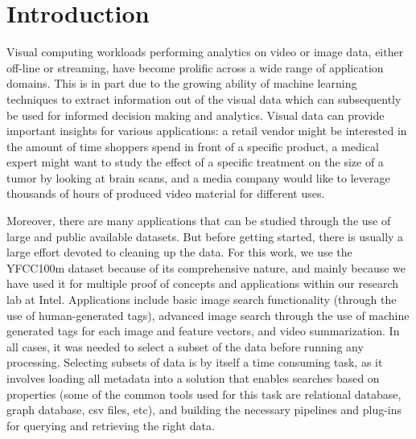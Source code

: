 \section{Introduction}
\label{intro}

Visual computing workloads performing analytics on
video or image data, either off-line or streaming,
have become prolific across a wide range of application domains.
This is in part due to the growing ability of machine learning techniques to
extract information out of the visual data which can subsequently be used
for informed decision making and analytics\cite{vdms-nips}.
Visual data can provide important insights for various applications:
a retail vendor might be interested in the amount of time
shoppers spend in front of a specific product, a medical expert might
want to study the effect of a specific treatment on the size of a tumor by
looking at brain scans, and a media company would like to leverage
thousands of hours of produced video material for different uses.

Moreover, there are many applications that can be studied through
the use of large and public available datasets.
But before getting started, there is usually
a large effort devoted to cleaning up the data.
For this work, we use the YFCC100m dataset because of its comprehensive nature,
and mainly because we have used it for multiple proof of concepts
and applications within our research lab at Intel.
Applications include basic image search functionality (through the use
of human-generated tags), advanced image search through the use of
machine generated tags for each image and feature vectors,
and video summarization.
In all cases, it was needed to select a subset of the data before running
any processing. Selecting subsets of data is by itself a time consuming task,
as it involves loading all metadata into a solution that enables searches
based on properties (some of the common tools used for this task are
relational database, graph database, csv files, etc), and
building the necessary pipelines and plug-ins
for querying and retrieving the right data.

